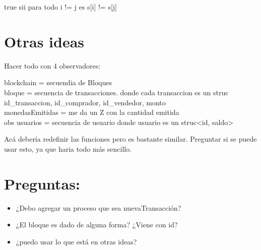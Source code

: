 \documentclass[10pt,a4paper]{article}
\begin{document}
{{   true sii para todo i != j es s[i] != s[j]
}

\section{Otras ideas}

Hacer todo con 4 observadores:

blockchain = secuendia de Bloques\\

bloque = secuencia de transacciones. donde cada transaccion es un struc \< id_transaccion, id_comprador, id_vendedor, monto \> \\

monedasEmitidas = me da un Z con la cantidad emitida\\

obs usuarios = secuencia de usuario donde usuario es un struc<id, saldo>

Acá debería redefinir las funciones pero es bastante similar. Preguntar si se puede usar esto, ya que haria todo más sencillo.




\section{Preguntas:}

\begin{itemize}
    \item ¿Debo agregar un proceso que sea nuevaTransacción?
    \item ¿El bloque es dado de alguna forma? ¿Viene con id?
    \item ¿puedo usar lo que está en otras ideas?
\end{itemize}

}
\end{document}
